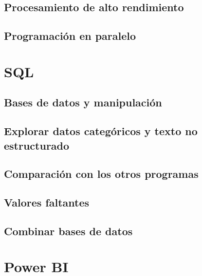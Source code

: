 \documentclass[
]{book}
\begin{document}
\hypertarget{procesamiento-de-alto-rendimiento}{%
\section{Procesamiento de alto rendimiento}\label{procesamiento-de-alto-rendimiento}}

\hypertarget{programaciuxf3n-en-paralelo}{%
\section{Programación en paralelo}\label{programaciuxf3n-en-paralelo}}

\hypertarget{sql}{%
\chapter{SQL}\label{sql}}

\hypertarget{bases-de-datos-y-manipulaciuxf3n}{%
\section{Bases de datos y manipulación}\label{bases-de-datos-y-manipulaciuxf3n}}

\hypertarget{explorar-datos-categuxf3ricos-y-texto-no-estructurado}{%
\section{Explorar datos categóricos y texto no estructurado}\label{explorar-datos-categuxf3ricos-y-texto-no-estructurado}}

\hypertarget{comparaciuxf3n-con-los-otros-programas}{%
\section{Comparación con los otros programas}\label{comparaciuxf3n-con-los-otros-programas}}

\hypertarget{valores-faltantes}{%
\section{Valores faltantes}\label{valores-faltantes}}

\hypertarget{combinar-bases-de-datos}{%
\section{Combinar bases de datos}\label{combinar-bases-de-datos}}

\hypertarget{power-bi}{%
\chapter{Power BI}\label{power-bi}}
\end{document}
